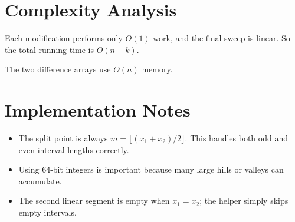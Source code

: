 \documentclass[11pt]{article}
\begin{document}
\section*{Complexity Analysis}

Each modification performs only $O(1)$ work, and the final sweep is linear.
So the total running time is $O(n+k)$.

The two difference arrays use $O(n)$ memory.

\section*{Implementation Notes}

\begin{itemize}[leftmargin=*]
    \item The split point is always $m=\lfloor (x_1+x_2)/2 \rfloor$.
    This handles both odd and even interval lengths correctly.
    \item Using 64-bit integers is important because many large hills or valleys can accumulate.
    \item The second linear segment is empty when $x_1=x_2$; the helper simply skips empty intervals.
\end{itemize}
\end{document}
